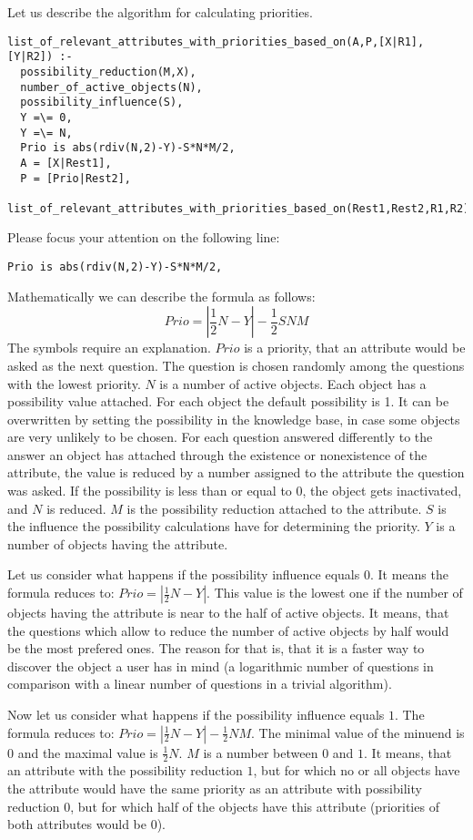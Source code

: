 \documentclass[a4paper]{article}
\begin{document}
Let us describe the algorithm for calculating priorities.
\begin{lstlisting}[caption=list\_of\_relevant\_attributes\_with\_priorities\_based\_on,label=lst:relevantattrs]
list_of_relevant_attributes_with_priorities_based_on(A,P,[X|R1],[Y|R2]) :-
  possibility_reduction(M,X),
  number_of_active_objects(N),
  possibility_influence(S),
  Y =\= 0,
  Y =\= N,
  Prio is abs(rdiv(N,2)-Y)-S*N*M/2,
  A = [X|Rest1],
  P = [Prio|Rest2],
  list_of_relevant_attributes_with_priorities_based_on(Rest1,Rest2,R1,R2).
\end{lstlisting}
Please focus your attention on the following line:
\begin{lstlisting}
Prio is abs(rdiv(N,2)-Y)-S*N*M/2,
\end{lstlisting}
Mathematically we can describe the formula as follows:
\[Prio=\left|\frac{1}{2}N-Y\right|-\frac{1}{2}SNM\]
The symbols require an explanation. \(Prio\) is a priority, that an attribute would be asked as the next question. The question is chosen randomly among the questions with the lowest priority. \(N\) is a number of active objects. Each object has a possibility value attached. For each object the default possibility is 1. It can be overwritten by setting the possibility in the knowledge base, in case some objects are very unlikely to be chosen. For each question answered differently to the answer an object has attached through the existence or nonexistence of the attribute, the value is reduced by a number assigned to the attribute the question was asked. If the possibility is less than or equal to \(0\), the object gets inactivated, and \(N\) is reduced. \(M\) is the possibility reduction attached to the attribute. \(S\) is the influence the possibility calculations have for determining the priority. \(Y\) is a number of objects having the attribute.

Let us consider what happens if the possibility influence equals \(0\). It means the formula reduces to: \(Prio=\left|\frac{1}{2}N-Y\right|\). This value is the lowest one if the number of objects having the attribute is near to the half of active objects. It means, that the questions which allow to reduce the number of active objects by half would be the most prefered ones. The reason for that is, that it is a faster way to discover the object a user has in mind (a logarithmic number of questions in comparison with a linear number of questions in a trivial algorithm). 

Now let us consider what happens if the possibility influence equals \(1\). The formula reduces to: \(Prio=\left|\frac{1}{2}N-Y\right|-\frac{1}{2}NM\). The minimal value of the minuend is \(0\) and the maximal value is \(\frac{1}{2}N\). \(M\) is a number between \(0\) and \(1\). It means, that an attribute with the possibility reduction \(1\), but for which no or all objects have the attribute would have the same priority as an attribute with possibility reduction \(0\), but for which half of the objects have this attribute (priorities of both attributes would be \(0\)). 
\end{document}
